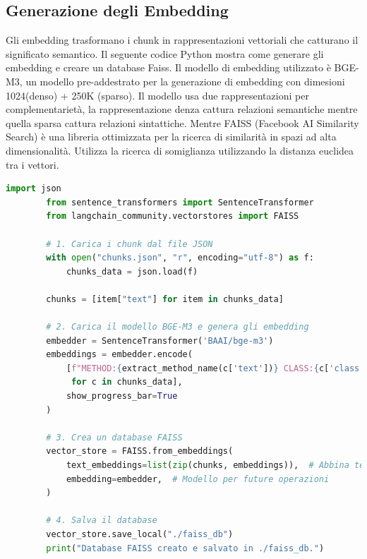 \documentclass[12pt,a4paper,openright,twoside]{book}
\begin{document}
    \subsection{Generazione degli Embedding}
    Gli embedding trasformano i chunk in rappresentazioni vettoriali che catturano il significato semantico.
    Il seguente codice Python mostra come generare gli embedding e creare un database Faiss.
    Il modello di embedding utilizzato è BGE-M3, un modello pre-addestrato per la generazione di embedding con dimesioni 1024(denso) + 250K (sparso).
    Il modello usa due rappresentazioni per complementarietà, la rappresentazione denza cattura relazioni semantiche mentre quella sparsa cattura relazioni sintattiche.
    Mentre FAISS \cite{faiss} (Facebook AI Similarity Search) è una libreria ottimizzata per la ricerca di similarità in spazi ad alta dimensionalità.
    Utilizza la ricerca di somiglianza utilizzando la distanza euclidea tra i vettori.
    
    \begin{lstlisting}[language=Python, caption={Codice Python per la generazione degli embedding e la creazione di un database FAISS}, label={lst:embeddings}]
        import json
        from sentence_transformers import SentenceTransformer
        from langchain_community.vectorstores import FAISS
        
        # 1. Carica i chunk dal file JSON
        with open("chunks.json", "r", encoding="utf-8") as f:
            chunks_data = json.load(f)
        
        chunks = [item["text"] for item in chunks_data]
        
        # 2. Carica il modello BGE-M3 e genera gli embedding
        embedder = SentenceTransformer('BAAI/bge-m3')
        embeddings = embedder.encode(
            [f"METHOD:{extract_method_name(c['text'])} CLASS:{c['class']} LINES:{c['start_line']}-{c['end_line']} CONTENT:{c['text']}" 
             for c in chunks_data],
            show_progress_bar=True
        )
        
        # 3. Crea un database FAISS
        vector_store = FAISS.from_embeddings(
            text_embeddings=list(zip(chunks, embeddings)),  # Abbina testi e embedding
            embedding=embedder,  # Modello per future operazioni
        )
        
        # 4. Salva il database
        vector_store.save_local("./faiss_db")
        print("Database FAISS creato e salvato in ./faiss_db.")
    \end{lstlisting}
\end{document}
